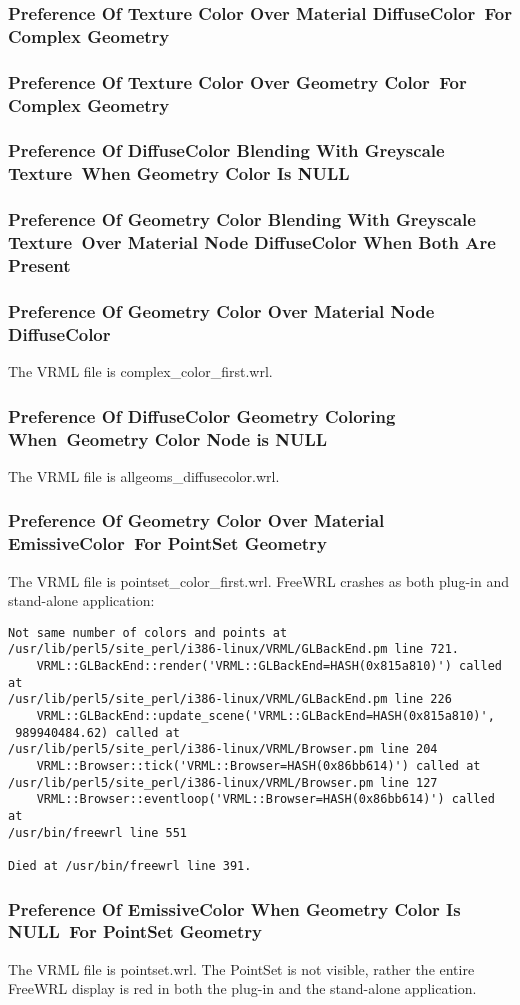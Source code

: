 \documentclass[12pt,letterpaper]{article}
\newcommand{\MatHa}{Preference Of Texture Color Over Material DiffuseColor~}
\newcommand{\MatHb}{For Complex Geometry}
\newcommand{\MatIa}{Preference Of Texture Color Over Geometry Color~}
\newcommand{\MatIb}{For Complex Geometry}
\newcommand{\MatJa}{Preference Of DiffuseColor Blending With Greyscale Texture~}
\newcommand{\MatJb}{When Geometry Color Is NULL}
\newcommand{\MatKa}{Preference Of Geometry Color Blending With Greyscale Texture~}
\newcommand{\MatKb}{Over Material Node DiffuseColor When Both Are Present}
\newcommand{\MatL}{Preference Of Geometry Color Over Material Node DiffuseColor}
\newcommand{\MatMa}{Preference Of DiffuseColor Geometry Coloring When~}
\newcommand{\MatMb}{Geometry Color Node is NULL}
\newcommand{\MatNa}{Preference Of Geometry Color Over Material EmissiveColor~}
\newcommand{\MatNb}{For PointSet Geometry}
\newcommand{\MatOa}{Preference Of EmissiveColor When Geometry Color Is NULL~}
\newcommand{\MatOb}{For PointSet Geometry}
\begin{document}
\subsubsection{\MatHa \MatHb}
\subsubsection{\MatIa \MatIb}
\subsubsection{\MatJa \MatJb}
\subsubsection{\MatKa \MatKb}
\subsubsection{\MatL}
The VRML file is complex\_color\_first.wrl.

\subsubsection{\MatMa \MatMb}
The VRML file is allgeoms\_diffusecolor.wrl.

\subsubsection{\MatNa \MatNb}
The VRML file is pointset\_color\_first.wrl.\newline
FreeWRL crashes as both plug-in and stand-alone application:
\begin{verbatim}
Not same number of colors and points at 
/usr/lib/perl5/site_perl/i386-linux/VRML/GLBackEnd.pm line 721.
    VRML::GLBackEnd::render('VRML::GLBackEnd=HASH(0x815a810)') called at 
/usr/lib/perl5/site_perl/i386-linux/VRML/GLBackEnd.pm line 226
    VRML::GLBackEnd::update_scene('VRML::GLBackEnd=HASH(0x815a810)',
 989940484.62) called at
/usr/lib/perl5/site_perl/i386-linux/VRML/Browser.pm line 204
    VRML::Browser::tick('VRML::Browser=HASH(0x86bb614)') called at 
/usr/lib/perl5/site_perl/i386-linux/VRML/Browser.pm line 127
    VRML::Browser::eventloop('VRML::Browser=HASH(0x86bb614)') called at 
/usr/bin/freewrl line 551

Died at /usr/bin/freewrl line 391.
\end{verbatim}

\subsubsection{\MatOa \MatOb}
The VRML file is pointset.wrl.\newline
The PointSet is not visible, rather the entire FreeWRL display is red in both the plug-in and
the stand-alone application.
\end{document}
